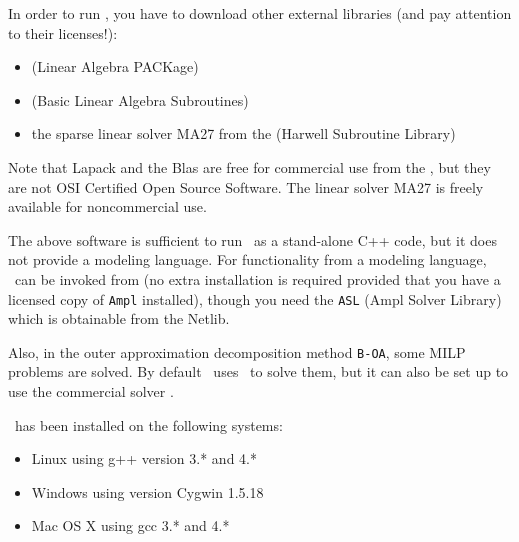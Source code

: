 In order to run {\Bonmin}, you have to download other external
libraries (and pay attention to their licenses!):
\begin{itemize}
\item {} (Linear Algebra
PACKage)
\item {} (Basic Linear Algebra
Subroutines)
\item the sparse linear solver MA27 from the
(Harwell Subroutine Library)
\end{itemize}

Note that Lapack and the Blas are free for commercial use from the
, but they are
not OSI Certified Open Source Software. The linear solver MA27 is
freely available for noncommercial use.

The above software is sufficient to run \Bonmin\ as a
stand-alone C++ code, but it does not provide a modeling language.
For functionality from a modeling language, \Bonmin\ can be
invoked from  (no extra installation is required provided
that you have a licensed copy of {\tt Ampl} installed), though you
need the {\tt ASL} (Ampl Solver Library) which is obtainable from the Netlib.

Also, in the outer approximation decomposition method {\tt B-OA}, some MILP problems are
solved. By default \Bonmin\ uses  \Cbc\ to solve them, but it can also be set up to use
the commercial solver .

\Bonmin\ has been installed on the following systems:
\begin{itemize}
\item Linux using g++ version 3.* and 4.*
\item Windows using version Cygwin 1.5.18
\item Mac OS X using gcc 3.* and 4.*
\end{itemize}


